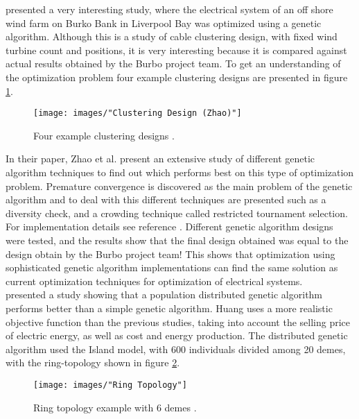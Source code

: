 \noindent \cite{Zhao} presented a very interesting study, where the electrical system of an off shore wind farm on Burko Bank in Liverpool Bay was optimized using a genetic algorithm. Although this is a study of cable clustering design, with fixed wind turbine count and positions, it is very interesting because it is compared against actual results obtained by the Burbo project team. To get an understanding of the optimization problem four example clustering designs are presented in figure \ref{Clustering Design}.\\


\begin{figure}[h!]
\begin{center}
\texttt{[image: images/"Clustering Design (Zhao)"]}
\caption{Four example clustering designs \citep{Zhao}.}
\label{Clustering Design}
\end{center}
\end{figure}


\noindent In their paper, Zhao et al. present an extensive study of different genetic algorithm techniques to find out which performs best on this type of optimization problem. Premature convergence is discovered as the main problem of the genetic algorithm and to deal with this different techniques are presented such as a diversity check, and a crowding technique called restricted tournament selection. For implementation details see reference \citep{Zhao}. Different genetic algorithm designs were tested, and the results show that the final design obtained was equal to the design obtain by the Burbo project team! This shows that optimization using sophisticated genetic algorithm implementations can find the same solution as current optimization techniques for optimization of electrical systems.\\


\noindent \cite{Huang} presented a study showing that a population distributed genetic algorithm performs better than a simple genetic algorithm. Huang uses a more realistic objective function than the previous studies, taking into account the selling price of electric energy, as well as cost and energy production. The distributed genetic algorithm used the Island model, with 600 individuals divided among 20 demes, with the ring-topology shown in figure \ref{Ring Topology}.\\

\begin{figure}[h!]
\begin{center}
\texttt{[image: images/"Ring Topology"]}
\caption{Ring topology example with 6 demes \citep{Huang}.}
\label{Ring Topology}
\end{center}
\end{figure}


